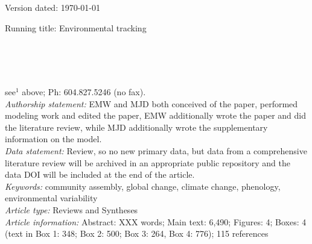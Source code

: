 \documentclass[11pt,letterpaper]{article}
\begin{document}
\begin{flushright}
Version dated: \today
\end{flushright}
\bigskip
\noindent Running title: Environmental tracking 
\bigskip
\medskip
\begin{center}
\\
\bigskip
{}\\
\\
\medskip
\end{center}
 see$^{1}$ above; Ph: 604.827.5246 (no fax).\\

\noindent \emph{Authorship statement:} EMW and MJD both conceived of the paper, performed modeling work and edited the paper, EMW additionally wrote the paper and did the literature review, while MJD additionally wrote the supplementary information on the model.  \\
\noindent \emph{Data statement:} Review, so no new primary data, but data from a comprehensive literature review will be archived in an appropriate public repository and the data DOI will be included at the end of the article. \\
\noindent \emph{Keywords:} community assembly, global change, climate change, phenology, environmental variability\\
\noindent \emph{Article type:} Reviews and Syntheses\\
\noindent \emph{Article information:} Abstract: XXX words; Main text: 6,490; Figures: 4; Boxes: 4 (text in Box 1: 348; Box 2: 500; Box 3: 264, Box 4: 776); 115 references
\newpage
\end{document}
